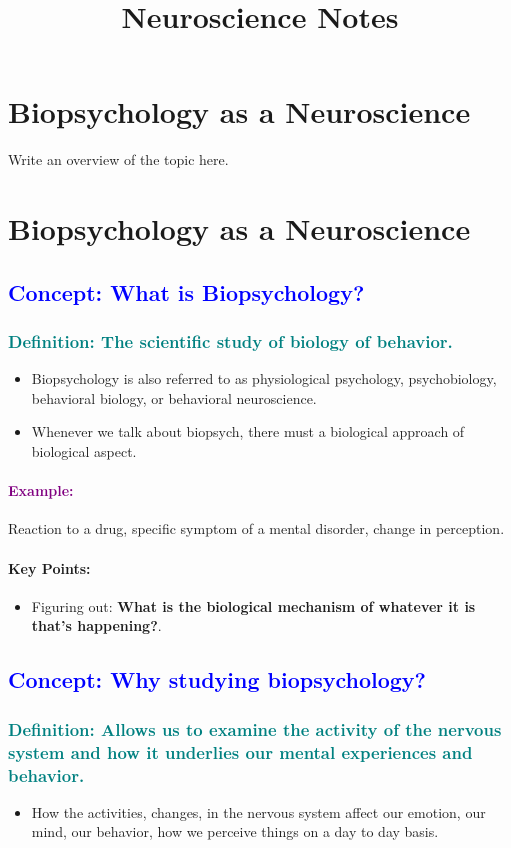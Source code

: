 \documentclass[12pt,a4paper]{article}
\title{\textbf{Neuroscience Notes}}
\author{}
\date{}
\newcommand{\concept}[1]{\subsection*{\textcolor{blue}{Concept: #1}}}
\newcommand{\definition}[1]{\subsubsection*{\textcolor{teal}{Definition: #1}}}
\newcommand{\example}[1]{\paragraph{\textcolor{purple}{Example:}} #1}
\newenvironment{keypoints}{\paragraph{\textbf{Key Points:}}\begin{itemize}[label=--]}{\end{itemize}}
\begin{document}
	
	\maketitle
	\tableofcontents
	\newpage
	
	\section*{Biopsychology as a Neuroscience}
	Write an overview of the topic here.
	
	\section{Biopsychology as a Neuroscience}
	\concept{What is Biopsychology?}
	\definition{The scientific study of \textbf{biology of} behavior.}
	\begin{itemize}
		\item Biopsychology is also referred to as physiological psychology, psychobiology, behavioral biology, or behavioral neuroscience.
		\item Whenever we talk about biopsych, there must a biological approach of biological aspect. 
	\end{itemize}
	\example{Reaction to a drug, specific symptom of a mental disorder, change in perception.}
	\begin{keypoints}
		\item Figuring out: \textbf{What is the biological mechanism of whatever it is that's happening?}.
	\end{keypoints}
	\concept{Why studying biopsychology?}
	\definition{Allows us to examine the activity of the nervous system and how it underlies our mental experiences and behavior.}
	\begin{itemize}
		\item How the activities, changes, in the nervous system affect our emotion, our mind, our behavior, how we perceive things on a day to day basis. 
	\end{itemize}
	
\end{document}
